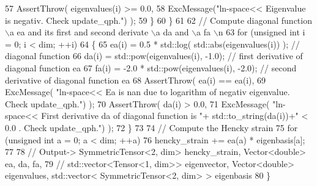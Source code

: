 \begin{DoxyCode}
57                 AssertThrow( eigenvalues(i) >= 0.0,
58                              ExcMessage(\textcolor{stringliteral}{"ln-space<< Eigenvalue is negativ. Check update\_qph."}) );
59             \}
60          \}
61     
62         \textcolor{comment}{// Compute diagonal function \(\backslash\)a ea and its first and second derivate \(\backslash\)a da and \(\backslash\)a fa \(\backslash\)n}
63          \textcolor{keywordflow}{for} (\textcolor{keywordtype}{unsigned} \textcolor{keywordtype}{int} i = 0; i < dim; ++i)
64          \{
65             ea(i) = 0.5 * std::log( std::abs(eigenvalues(i)) ); \textcolor{comment}{// diagonal function}
66             da(i) = std::pow(eigenvalues(i), -1.0);             \textcolor{comment}{// first derivative of diagonal function ea}
67             fa(i) = -2.0 * std::pow(eigenvalues(i), -2.0);          \textcolor{comment}{// second derivative of diagonal
       function ea}
68             AssertThrow( ea(i) == ea(i),
69                          ExcMessage( \textcolor{stringliteral}{"ln-space<< Ea is nan due to logarithm of negativ eigenvalue. Check
       update\_qph."}) );
70             AssertThrow( da(i) > 0.0,
71                          ExcMessage( \textcolor{stringliteral}{"ln-space<< First derivative da of diagonal function is "}+
      std::to\_string(da(i))+\textcolor{stringliteral}{" < 0.0 . Check update\_qph."}) );
72          \}
73     
74         \textcolor{comment}{// Compute the Hencky strain}
75          \textcolor{keywordflow}{for} (\textcolor{keywordtype}{unsigned} \textcolor{keywordtype}{int} a = 0; a < dim; ++a)
76             hencky\_strain += ea(a) * eigenbasis[a];
77          
78         \textcolor{comment}{// Output-> SymmetricTensor<2, dim> hencky\_strain, Vector<double> ea, da, fa,}
79         \textcolor{comment}{//          std::vector<Tensor<1, dim>> eigenvector, Vector<double> eigenvalues, std::vector<
       SymmetricTensor<2, dim> > eigenbasis}
80     \}
\end{DoxyCode}
